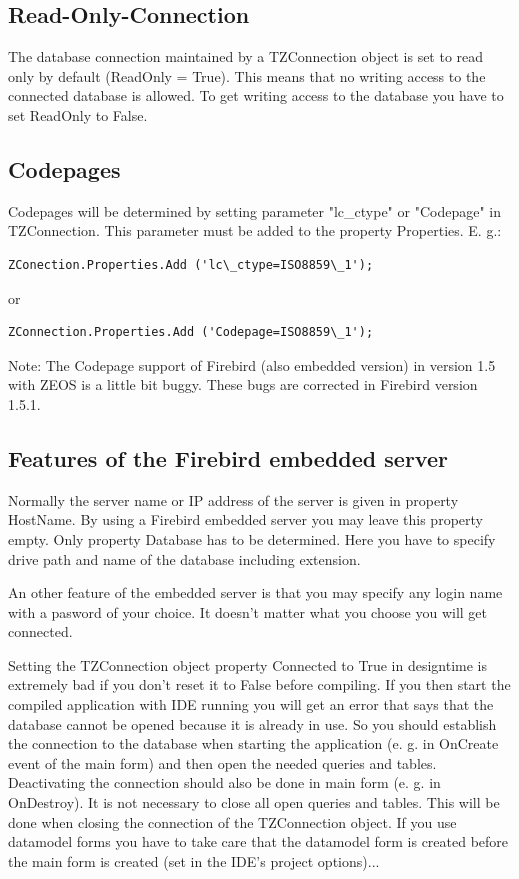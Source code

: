 \documentclass[a4paper,12pt,oneside]{book}
\begin{document}
\subsection{Read-Only-Connection}

The database connection maintained by a TZConnection object is set to read only by default (ReadOnly = True).
This means that no writing access to the connected database is allowed.
To get writing access to the database you have to set ReadOnly to False.

\subsection{Codepages}
Codepages will be determined by setting parameter "lc\_ctype" or "Codepage" in TZConnection.
This parameter must be added to the property Properties. E. g.:
\begin{verbatim}
ZConection.Properties.Add ('lc\_ctype=ISO8859\_1');
\end{verbatim}
or
\begin{verbatim}
ZConnection.Properties.Add ('Codepage=ISO8859\_1');
\end{verbatim}

Note: The Codepage support of Firebird (also embedded version) in version 1.5 with ZEOS is a little bit buggy. These bugs are corrected in Firebird version 1.5.1.

\subsection{Features of the Firebird embedded server}

Normally the server name or IP address of the server is given in property HostName.
By using a Firebird embedded server you may leave this property empty.
Only property Database has to be determined.
Here you have to specify drive path and name of the database including extension.

An other feature of the embedded server is that you may specify any login name with a pasword of your choice.
It doesn't matter what you choose you will get connected.

Setting the TZConnection object property Connected to True in designtime is extremely bad if you don't reset it to False before compiling.
If you then start the compiled application with IDE running you will get an error that says that the database cannot be opened because it is already in use.
So you should establish the connection to the database when starting the application (e. g. in OnCreate event of the main form) and then open the needed queries and tables.
Deactivating the connection should also be done in main form (e. g. in OnDestroy).
It is not necessary to close all open queries and tables.
This will be done when closing the connection of the TZConnection object.
If you use datamodel forms you have to take care that the datamodel form is created before the main form is created (set in the IDE's project options)...
\end{document}
